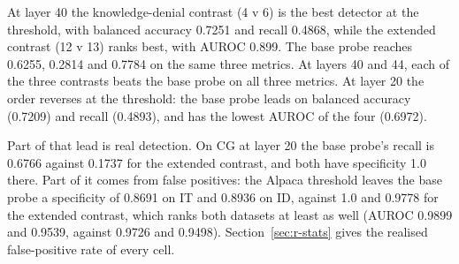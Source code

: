 At layer 40 the knowledge-denial contrast (4 v 6) is the best detector at the threshold, with balanced accuracy 0.7251 and recall 0.4868, while the extended contrast (12 v 13) ranks best, with AUROC 0.899. %
The base probe reaches 0.6255, 0.2814 and 0.7784 on the same three metrics. %
At layers 40 and 44, each of the three contrasts beats the base probe on all three metrics. %
At layer 20 the order reverses at the threshold: the base probe leads on balanced accuracy (0.7209) and recall (0.4893), and has the lowest AUROC of the four (0.6972). %

Part of that lead is real detection.
On CG at layer 20 the base probe's recall is 0.6766 against 0.1737 for the extended contrast, and both have specificity 1.0 there. %
Part of it comes from false positives: the Alpaca threshold leaves the base probe a specificity of 0.8691 on IT and 0.8936 on ID, against 1.0 and 0.9778 for the extended contrast, which ranks both datasets at least as well (AUROC 0.9899 and 0.9539, against 0.9726 and 0.9498). %
Section~\ref{sec:r-stats} gives the realised false-positive rate of every cell.

